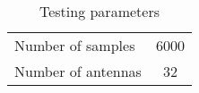 \documentclass[a4paper,conference]{IEEEtran}
\begin{document}
\begin{table}[!hb]
	\centering
	\caption{Testing parameters}
	\begin{tabular}{|l|c|}
	\hline
	Number of samples       & 6000 \\
	Number of antennas 		& 32 \\
	\hline
	\end{tabular}
\end{table}
\end{document}
